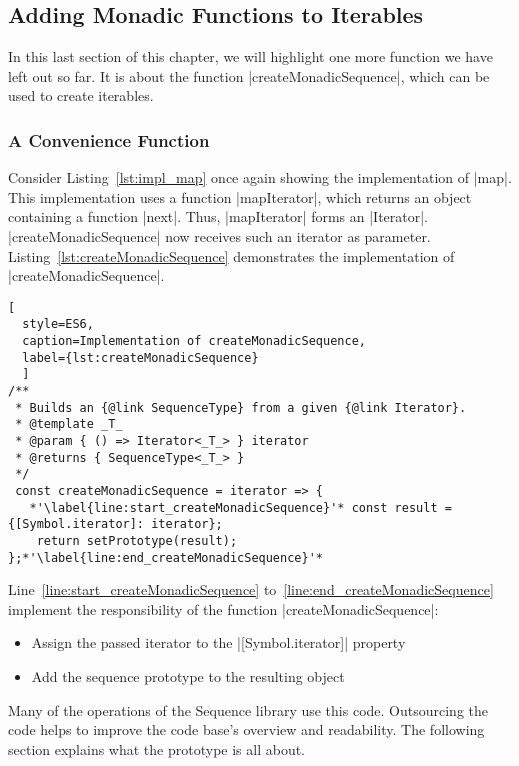 \subsection{Adding Monadic Functions to Iterables}
\label{sub:Adding Monadic Functions to Iterables}
In this last section of this chapter, we will highlight one more function we 
have left out so far. It is about the function |createMonadicSequence|, which
can be used to create iterables.

\subsubsection{A Convenience Function}
\label{subsub:A Convenience Function}
Consider Listing~\ref{lst:impl_map} once again showing the implementation of
|map|. This implementation uses a function |mapIterator|, which returns an
object containing a function |next|. Thus, |mapIterator| forms an |Iterator|.
|createMonadicSequence| now receives such an iterator as parameter.
Listing~\ref{lst:createMonadicSequence} demonstrates the implementation of
|createMonadicSequence|.

\begin{lstlisting}[
  style=ES6, 
  caption=Implementation of createMonadicSequence,
  label={lst:createMonadicSequence}
  ]
/**
 * Builds an {@link SequenceType} from a given {@link Iterator}.
 * @template _T_
 * @param { () => Iterator<_T_> } iterator
 * @returns { SequenceType<_T_> }
 */
 const createMonadicSequence = iterator => {
   *'\label{line:start_createMonadicSequence}'* const result = {[Symbol.iterator]: iterator};
    return setPrototype(result);
};*'\label{line:end_createMonadicSequence}'*
\end{lstlisting}

Line~\ref{line:start_createMonadicSequence}
to~\ref{line:end_createMonadicSequence} implement the responsibility of the
function |createMonadicSequence|:

\begin{itemize}
  \item{Assign the passed iterator to the |[Symbol.iterator]| property}
  \item{Add the sequence prototype to the resulting object}
\end{itemize}

Many of the operations of the Sequence library use this code.
Outsourcing the code helps to improve the code base's overview and readability.
The following section explains what the prototype is all about.

